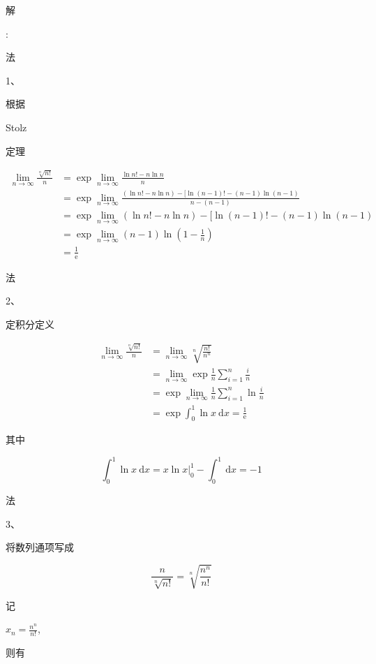 \documentclass[10pt]{article}
\begin{document}
\begin{CJK}{UTF8}{mj}解\end{CJK}: \begin{CJK}{UTF8}{mj}法\end{CJK} 1、\begin{CJK}{UTF8}{mj}根据\end{CJK} Stolz \begin{CJK}{UTF8}{mj}定理\end{CJK}
$$
\begin{aligned}
\lim _{n \rightarrow \infty} \frac{\sqrt[n]{n !}}{n} &=\exp \lim _{n \rightarrow \infty} \frac{\ln n !-n \ln n}{n} \\
&=\exp \lim _{n \rightarrow \infty} \frac{(\ln n !-n \ln n)-[\ln (n-1) !-(n-1) \ln (n-1)}{n-(n-1)} \\
&=\exp \lim _{n \rightarrow \infty}(\ln n !-n \ln n)-[\ln (n-1) !-(n-1) \ln (n-1)\\
&=\exp \lim _{n \rightarrow \infty}(n-1) \ln \left(1-\frac{1}{n}\right) \\
&=\frac{1}{\mathrm{e}}
\end{aligned}
$$
\begin{CJK}{UTF8}{mj}法\end{CJK} 2、\begin{CJK}{UTF8}{mj}定积分定义\end{CJK}
$$
\begin{aligned}
\lim _{n \rightarrow \infty} \frac{\sqrt[n]{n !}}{n} &=\lim _{n \rightarrow \infty} \sqrt[n]{\frac{n !}{n^{n}}} \\
&=\lim _{n \rightarrow \infty} \exp \frac{1}{n} \sum_{i=1}^{n} \frac{i}{n} \\
&=\exp \lim _{n \rightarrow \infty} \frac{1}{n} \sum_{i=1}^{n} \ln \frac{i}{n} \\
&=\exp \int_{0}^{1} \ln x \mathrm{~d} x=\frac{1}{\mathrm{e}}
\end{aligned}
$$
\begin{CJK}{UTF8}{mj}其中\end{CJK}
$$
\int_{0}^{1} \ln x \mathrm{~d} x=\left.x \ln x\right|_{0} ^{1}-\int_{0}^{1} \mathrm{~d} x=-1
$$
\begin{CJK}{UTF8}{mj}法\end{CJK} 3、\begin{CJK}{UTF8}{mj}将数列通项写成\end{CJK}
$$
\frac{n}{\sqrt[n]{n !}}=\sqrt[n]{\frac{n^{n}}{n !}}
$$
\begin{CJK}{UTF8}{mj}记\end{CJK} $x_{n}=\frac{n^{n}}{n !}$, \begin{CJK}{UTF8}{mj}则有\end{CJK}
\end{document}
